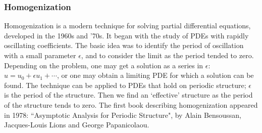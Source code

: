 \documentclass[a4paper]{report}
\newcommand{\beff}{\ensuremath{b_{\mathrm{eff}}}}
\begin{document}
\begin{center}
\end{center}


\subsubsection*{Homogenization}

Homogenization is a modern technique for solving partial differential equations, developed in the 1960s and '70s.  It began with the study of PDEs with rapidly oscillating coefficients.  
The basic idea was to identify the period of oscillation with a small parameter $\epsilon$, and to consider the limit as the period tended to zero.  Depending on the problem, one may get a solution as a series in $\epsilon$: $u = u_0 + \epsilon u_1 + \cdots$, or one may obtain a limiting PDE for which a solution can be found.
The technique can be applied to PDEs that hold on periodic structure; $\epsilon$ is the period of the structure.  Then we find an `effective' structure as the period of the structure tends to zero.  The first book describing homogenization appeared in 1978: ``Asymptotic Analysis for Periodic Structure", by Alain Bensoussan, Jacques-Louis Lions and George Papanicolaou.  
\end{document}
